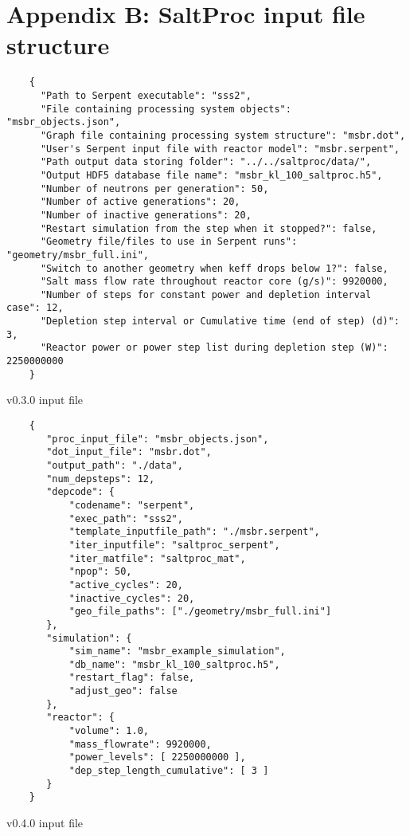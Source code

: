 \appendix
\chapter{Appendix B: SaltProc input file structure}
\label{appex:input-files}

\begin{listing}[!ht]
    \begin{verbatim}
    {
      "Path to Serpent executable": "sss2",
      "File containing processing system objects": "msbr_objects.json",
      "Graph file containing processing system structure": "msbr.dot",
      "User's Serpent input file with reactor model": "msbr.serpent",
      "Path output data storing folder": "../../saltproc/data/",
      "Output HDF5 database file name": "msbr_kl_100_saltproc.h5",
      "Number of neutrons per generation": 50,
      "Number of active generations": 20,
      "Number of inactive generations": 20,
      "Restart simulation from the step when it stopped?": false,
      "Geometry file/files to use in Serpent runs": "geometry/msbr_full.ini",
      "Switch to another geometry when keff drops below 1?": false,
      "Salt mass flow rate throughout reactor core (g/s)": 9920000,
      "Number of steps for constant power and depletion interval case": 12,
      "Depletion step interval or Cumulative time (end of step) (d)": 3,
      "Reactor power or power step list during depletion step (W)": 2250000000
    }
    \end{verbatim}
    \caption{\SaltProc v0.3.0 input file}
    \label{listing:1}
\end{listing}

\begin{listing}[!ht]
    \begin{verbatim}
    {
       "proc_input_file": "msbr_objects.json",
       "dot_input_file": "msbr.dot",
       "output_path": "./data",
       "num_depsteps": 12,
       "depcode": {
           "codename": "serpent",
           "exec_path": "sss2",
           "template_inputfile_path": "./msbr.serpent",
           "iter_inputfile": "saltproc_serpent",
           "iter_matfile": "saltproc_mat",
           "npop": 50,
           "active_cycles": 20,
           "inactive_cycles": 20,
           "geo_file_paths": ["./geometry/msbr_full.ini"]
       },
       "simulation": {
           "sim_name": "msbr_example_simulation",
           "db_name": "msbr_kl_100_saltproc.h5",
           "restart_flag": false,
           "adjust_geo": false
       },
       "reactor": {
           "volume": 1.0,
           "mass_flowrate": 9920000,
           "power_levels": [ 2250000000 ],
           "dep_step_length_cumulative": [ 3 ]
       }
    }
    \end{verbatim}
    \caption{\SaltProc v0.4.0 input file}
    \label{listing:2}
\end{listing}

